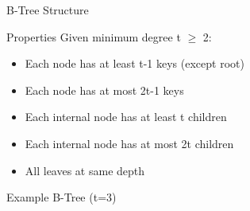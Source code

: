 \documentclass[aspectratio=169,xcolor=dvipsnames]{beamer}
\begin{document}
\begin{frame}{B-Tree Structure}
  \begin{block}{Properties}
    Given minimum degree t $\ge$ 2:
    \begin{itemize}
      \item Each node has at least t-1 keys (except root)
      \item Each node has at most 2t-1 keys
      \item Each internal node has at least t children
      \item Each internal node has at most 2t children
      \item All leaves at same depth
    \end{itemize}
  \end{block}

  \begin{exampleblock}{Example B-Tree (t=3)}
    \begin{center}
    \end{center}
  \end{exampleblock}
\end{frame}
\end{document}

